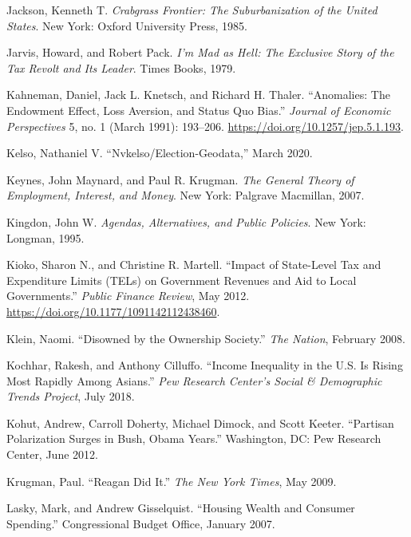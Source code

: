 \documentclass[12pt,oneside]{psthesis}
\begin{document}
\leavevmode\hypertarget{ref-jacksonCrabgrassFrontierSuburbanization1985}{}%
Jackson, Kenneth T. \emph{Crabgrass Frontier: The Suburbanization of the United States}. New York: Oxford University Press, 1985.

\leavevmode\hypertarget{ref-jarvis1979mad}{}%
Jarvis, Howard, and Robert Pack. \emph{I'm Mad as Hell: The Exclusive Story of the Tax Revolt and Its Leader}. Times Books, 1979.

\leavevmode\hypertarget{ref-kahneman1991anomalies}{}%
Kahneman, Daniel, Jack L. Knetsch, and Richard H. Thaler. ``Anomalies: The Endowment Effect, Loss Aversion, and Status Quo Bias.'' \emph{Journal of Economic Perspectives} 5, no. 1 (March 1991): 193--206. \url{https://doi.org/10.1257/jep.5.1.193}.

\leavevmode\hypertarget{ref-kelso2020nvkelso}{}%
Kelso, Nathaniel V. ``Nvkelso/Election-Geodata,'' March 2020.

\leavevmode\hypertarget{ref-keynes2007general}{}%
Keynes, John Maynard, and Paul R. Krugman. \emph{The General Theory of Employment, Interest, and Money}. New York: Palgrave Macmillan, 2007.

\leavevmode\hypertarget{ref-kingdon1995agendas}{}%
Kingdon, John W. \emph{Agendas, Alternatives, and Public Policies}. New York: Longman, 1995.

\leavevmode\hypertarget{ref-kioko2012impact}{}%
Kioko, Sharon N., and Christine R. Martell. ``Impact of State-Level Tax and Expenditure Limits (TELs) on Government Revenues and Aid to Local Governments.'' \emph{Public Finance Review}, May 2012. \url{https://doi.org/10.1177/1091142112438460}.

\leavevmode\hypertarget{ref-klein2008disowned}{}%
Klein, Naomi. ``Disowned by the Ownership Society.'' \emph{The Nation}, February 2008.

\leavevmode\hypertarget{ref-kochhar2018income}{}%
Kochhar, Rakesh, and Anthony Cilluffo. ``Income Inequality in the U.S. Is Rising Most Rapidly Among Asians.'' \emph{Pew Research Center's Social \& Demographic Trends Project}, July 2018.

\leavevmode\hypertarget{ref-kohut2012partisan}{}%
Kohut, Andrew, Carroll Doherty, Michael Dimock, and Scott Keeter. ``Partisan Polarization Surges in Bush, Obama Years.'' Washington, DC: Pew Research Center, June 2012.

\leavevmode\hypertarget{ref-krugman2009reagan}{}%
Krugman, Paul. ``Reagan Did It.'' \emph{The New York Times}, May 2009.

\leavevmode\hypertarget{ref-lasky2007housing}{}%
Lasky, Mark, and Andrew Gisselquist. ``Housing Wealth and Consumer Spending.'' Congressional Budget Office, January 2007.
\end{document}
